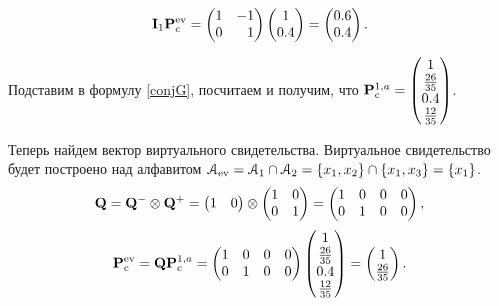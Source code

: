 \begin{equation*}
\mathbf{I}_1\Pc^{\ev} = \begin{pmatrix*}[r] 1 & -1 \\ 0 & 1 \end{pmatrix*} \begin{pmatrix}1 \\ 0.4\end{pmatrix} = \begin{pmatrix}
0.6 \\ 0.4 \end{pmatrix}.
\end{equation*}

Подставим в формулу \ref{conjG}, посчитаем и получим, что $\mathbf{P}_\mathrm{c}^{1,a} = \begin{pmatrix}
1 \\  \frac{26}{35} \\ 0.4 \\ \frac{12}{35}
\end{pmatrix}$.

Теперь найдем вектор виртуального свидетельства. Виртуальное свидетельство будет построено над алфавитом 
$\mathcal{A}_{\mathrm{ev}} = \mathcal{A}_1 \cap \mathcal{A}_2 = \{x_1, x_2\} \cap \{x_1, x_3\} = \{x_1\}$.
\begin{equation*}
\mathbf{Q} = \mathbf{Q}^- \otimes \mathbf{Q}^+ =  \begin{pmatrix} 1 & 0  \end{pmatrix} \otimes
  \begin{pmatrix} 1 & 0 \\ 0 & 1 \end{pmatrix} = \begin{pmatrix}
1 & 0  & 0 & 0 \\ 0 & 1 & 0 & 0
\end{pmatrix},
\end{equation*}
\begin{equation*}
\mathbf{P}_\mathrm{c}^{\mathrm{ev}} = \mathbf{Q}\mathbf{P}_\mathrm{c}^{1, a} =  \begin{pmatrix}
1 & 0  & 0 & 0 \\ 0 & 1  & 0 & 0
\end{pmatrix} \begin{pmatrix}
1 \\  \frac{26}{35} \\ 0.4 \\ \frac{12}{35}
\end{pmatrix} = \begin{pmatrix}
1 \\ \frac{26}{35}
\end{pmatrix}.
\end{equation*} 

